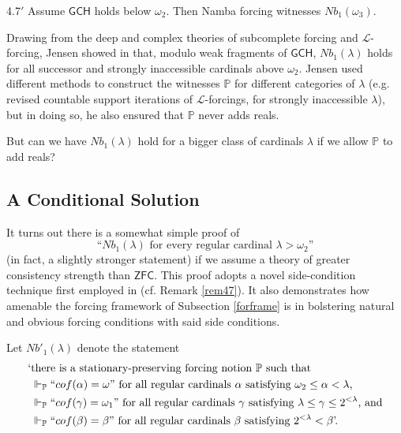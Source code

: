\documentclass[12pt]{article}
\numberwithin{equation}{section}
\begin{document}
\begin{customfact}{4.7$'$}\label{f46p}
Assume $\mathsf{GCH}$ holds below $\omega_2$. Then Namba forcing witnesses $Nb_1(\omega_3)$.
\end{customfact}

Drawing from the deep and complex theories of subcomplete forcing and $\mathcal{L}$-forcing, Jensen showed in \cite{lforcing} that, modulo weak fragments of $\mathsf{GCH}$, $Nb_1(\lambda)$ holds for all successor and strongly inaccessible cardinals above $\omega_2$. Jensen used different methods to construct the witnesses $\mathbb{P}$ for different categories of $\lambda$ (e.g. revised countable support iterations of $\mathcal{L}$-forcings, for strongly inaccessible $\lambda$), but in doing so, he also ensured that $\mathbb{P}$ never adds reals. 

But can we have $Nb_1(\lambda)$ hold for a bigger class of cardinals $\lambda$ if we allow $\mathbb{P}$ to add reals?

\subsection{A Conditional Solution}

It turns out there is a somewhat simple proof of $$\text{``} Nb_1(\lambda) \text{ for every regular cardinal } \lambda > \omega_2 \text{''}$$ (in fact, a slightly stronger statement) if we assume a theory of greater consistency strength than $\mathsf{ZFC}$. This proof adopts a novel side-condition technique first employed in \cite{schindler} (cf. Remark \ref{rem47}). It also demonstrates how amenable the forcing framework of Subsection \ref{forframe} is in bolstering natural and obvious forcing conditions with said side conditions. 

\begin{defi}
Let $Nb'_1(\lambda)$ denote the statement
\begin{align*}
    \text{`} & \text{there is a stationary-preserving forcing notion } \mathbb{P} \text{ such that} \\ 
    & \Vdash_{\mathbb{P}} ``cof(\alpha) = \omega" \text{ for all regular cardinals } \alpha \text{ satisfying } \omega_2 \leq \alpha < \lambda \text{,} \\
    & \Vdash_{\mathbb{P}} ``cof(\gamma) = \omega_1" \text{ for all regular cardinals } \gamma \text{ satisfying } \lambda \leq \gamma \leq 2^{< \lambda} \text{, and} \\
    & \Vdash_{\mathbb{P}} ``cof(\beta) = \beta" \text{ for all regular cardinals } \beta \text{ satisfying } 2^{< \lambda} < \beta \text{'.}
\end{align*}
\end{defi}
\end{document}
